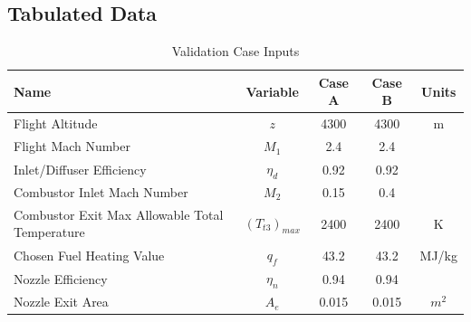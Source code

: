 \documentclass[conf]{new-aiaa} %
\begin{document}
\subsection{Tabulated Data}
\begin{table}[H] %
    \caption{\label{tab:val_case_input}Validation Case Inputs}
    \centering
    \begin{tabular}{lcccc}
        \hline
        Name& Variable& Case A& Case B& Units\\\hline
        Flight Altitude& $z$& 4300& 4300& m\\
        Flight Mach Number& $M_1$& 2.4& 2.4\\
        Inlet/Diffuser Efficiency& $\eta_d$& 0.92& 0.92\\
        Combustor Inlet Mach Number& $M_2$& 0.15& 0.4\\
        Combustor Exit Max Allowable Total Temperature& $(T_{t3})_{max}$& 2400& 2400& K\\
        Chosen Fuel Heating Value& $q_f$& 43.2& 43.2& MJ/kg\\
        Nozzle Efficiency& $\eta_n$& 0.94& 0.94\\
        Nozzle Exit Area& $A_e$& 0.015& 0.015& $m^2$\\
        \hline
    \end{tabular}
\end{table}
\end{document}
